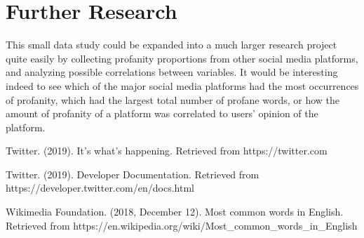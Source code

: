 \documentclass{article}
\begin{document}
\section{Further Research}
\tab This small data study could be expanded into a much larger research project quite easily by collecting profanity proportions from other social media platforms, and analyzing possible correlations between variables. It would be interesting indeed to see which of the major social media platforms had the most occurrences of profanity, which had the largest total number of profane words, or how the amount of profanity of a platform was correlated to users' opinion of the platform. 

\newpage
\begin{thebibliography}{}
	Twitter. (2019). It's what's happening.
	Retrieved from {https://twitter.com}
	
	Twitter. (2019). Developer Documentation.
	Retrieved from {https://developer.twitter.com/en/docs.html}
	
	Wikimedia Foundation. (2018, December 12). Most common words in English. 
	Retrieved from {https://en.wikipedia.org/wiki/Most_common_words_in_English}
	
\end{thebibliography}
\end{document}
